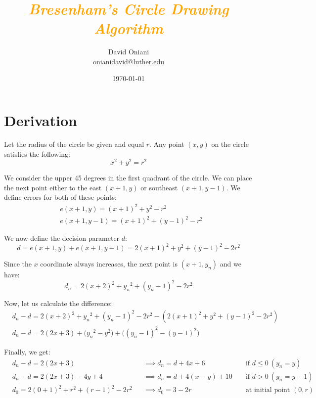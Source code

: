 \documentclass{article}
\author{David Oniani\\
        \href{mailto:onianidavid@luther.edu}{onianidavid@luther.edu}}
\title{\textcolor{orange}{\textit{Bresenham's Circle Drawing Algorithm}}}
\date{\today}
\begin{document}
\maketitle


\section{Derivation}

Let the radius of the circle be given and equal \(r\). Any point \((x, y)\) on
the circle satisfies the following:
\begin{equation}
    x^2 + y^2 = r^2
\end{equation}

We consider the upper 45 degrees in the first quadrant of the circle. We can
place the next point either to the east \((x + 1, y)\) or southeast \((x + 1, y
- 1)\). We define errors for both of these points:
\begin{align}
    &e(x + 1, y) = {(x + 1)}^2 + y^2 - r^2\\
    &e(x + 1, y - 1) = {(x + 1)}^2 + {(y - 1)}^2 - r^2
\end{align}

We now define the decision parameter \(d\):
\begin{equation}
    d = e(x + 1, y) + e(x + 1, y - 1) = 2{(x + 1)}^2 + y^2 + {(y - 1)}^2 - 2r^2
\end{equation}

Since the \(x\) coordinate always increases, the next point is \((x + 1, y_n)\)
and we have:
\begin{equation}
    d_n = 2{(x + 2)}^2 + {y_n}^2 + {(y_n - 1)}^2 - 2r^2
\end{equation}

Now, let us calculate the difference:
\begin{align}
    &d_n - d = 2{(x + 2)}^2 + {y_n}^2 + {({y_n} - 1)}^2 - 2r^2 -
        (2{(x + 1)}^2 + {y}^2 + {(y - 1)}^2 - 2r^2)\\
    &d_n - d = 2(2x + 3) + \big({y_n}^2 - y^2\big) +
        \big({(y_n - 1)}^2 - {(y - 1)}^2\big)
\end{align}

Finally, we get:
\begin{align}
    &d_n - d = 2(2x + 3) &&\implies d_n = d + 4x + 6
        &&\text{ if } d \leq 0\ (y_n = y)\\
    &d_n - d = 2(2x + 3) - 4y + 4 &&\implies d_n = d + 4(x - y) + 10
        &&\text{ if } d > 0\ (y_n = y - 1)\\
    &d_0 = 2{(0 + 1)}^2 + r^2 + {(r - 1)}^2 - 2r^2 &&\implies d_0 = 3 - 2r
        &&\text{ at initial point } (0, r)
\end{align}
\end{document}
